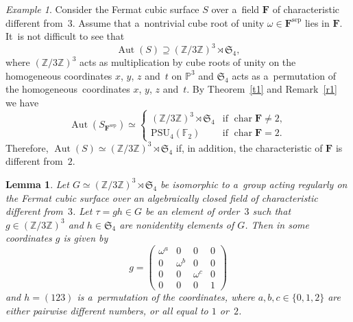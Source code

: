 \documentclass{amsart}
\numberwithin{equation}{section}
\theoremstyle{plain}
\newtheorem{lemma}{Lemma}
\theoremstyle{definition}
\theoremstyle{remark}
\newtheorem{example}{Example}
\begin{document}
\begin{example}
\label{e1}
Consider the Fermat cubic surface $S$ over a~field $\mathbf{F}$ of characteristic different from~$3$. Assume that a~nontrivial cube root of unity $\omega \in \mathbf{F}^{\mathrm{sep}}$ lies in $\mathbf{F}$. It~is not difficult to see that
$$
\operatorname{Aut}(S) \supseteq (\mathbb{Z}/3\mathbb{Z})^3 \rtimes \mathfrak{S}_4,
$$
where $(\mathbb{Z}/3\mathbb{Z})^3$ acts as multiplication by cube roots of unity on the homogeneous coordinates $x$, $y$, $z$ and~$t$ on $\mathbb{P}^3$ and $\mathfrak{S}_4$ acts as a~permutation of the homoge\-neous~coordinates $x$, $y$, $z$ and~$t$. By Theorem~\ref{t1} and Remark~\ref{r1} we have
$$
\operatorname{Aut}(S_{\mathbf{F}^{\mathrm{sep}}}) \simeq
\begin{cases}
 (\mathbb{Z}/3\mathbb{Z})^3 \rtimes \mathfrak{S}_4 &\text{if }\operatorname{char}\mathbf{F} \neq 2,
 \\
\mathrm{PSU}_4(\mathbb{F}_2) &\text{if }\operatorname{char}\mathbf{F} = 2.
\end{cases}
$$
Therefore, $\operatorname{Aut}(S) \simeq (\mathbb{Z}/3\mathbb{Z})^3 \rtimes \mathfrak{S}_4$ if, in addition, the characteristic of $\mathbf{F}$ is different from~$2$.
\end{example}

\begin{lemma}
\label{l16}
Let $G \simeq (\mathbb{Z}/3\mathbb{Z})^3 \rtimes \mathfrak{S}_4$ be isomorphic to a~group acting regularly on the Fermat cubic surface over an algebraically closed field of characteristic different from~$3$. Let $\tau=gh \in G$ be an element of order~$3$ such that $g \in (\mathbb{Z}/3\mathbb{Z})^3$ and $h \in \mathfrak{S}_4$ are nonidentity elements of $G$. Then in some coordinates $g$ is given by
$$
g=\begin{pmatrix}
\omega^a & 0 & 0 & 0\\
0 & \omega^b & 0 & 0\\
0 & 0 & \omega^c & 0\\
0 & 0 & 0 & 1
\end{pmatrix}
$$
and $h=(123)$ is a~permutation of the coordinates, where $a,b,c \in \{0,1,2\}$ are either pairwise different numbers, or all equal to $1$ or~$2$.
\end{lemma}
\end{document}
